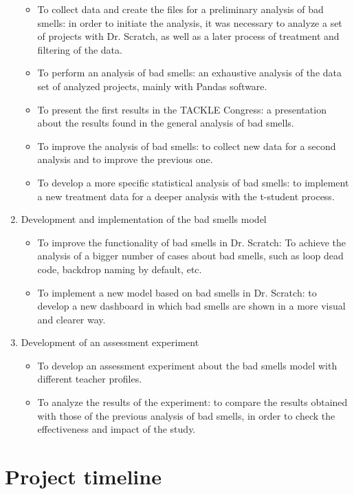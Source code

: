 \begin{enumerate}
\begin{itemize}
        \item To collect data and create the files for a preliminary analysis of bad smells: in order to initiate the analysis, it was necessary to analyze a set of projects with Dr. Scratch, as well as a later process of treatment and filtering of the data.
        \item To perform an analysis of bad smells: an exhaustive analysis of the data set of analyzed projects, mainly with Pandas software. 
        \item To present the first results in the TACKLE Congress: a presentation about the results found in the general analysis of bad smells.
        \item To improve the analysis of bad smells: to collect new data for a second analysis and to improve the previous one.
        \item To develop a more specific statistical analysis of bad smells: to implement a new treatment data for a deeper analysis with the t-student process. 
    \end{itemize}
    \item Development and implementation of the bad smells model
    \begin{itemize}
        \item To improve the functionality of bad smells in Dr. Scratch: To achieve the analysis of a bigger number of cases about bad smells, such as loop dead code, backdrop naming by default, etc.
        \item To implement a new model based on bad smells in Dr. Scratch: to develop a new dashboard in which bad smells are shown in a more visual and clearer way.
    \end{itemize}
    \item Development of an assessment experiment
    \begin{itemize}
        \item To develop an assessment experiment about the bad smells model with different teacher profiles.
        \item To analyze the results of the experiment: to compare the results obtained with those of the previous analysis of bad smells, in order to check the effectiveness and impact of the study.
    \end{itemize}
\end{enumerate}



\section{Project timeline}
\label{sec:timeline-project}

